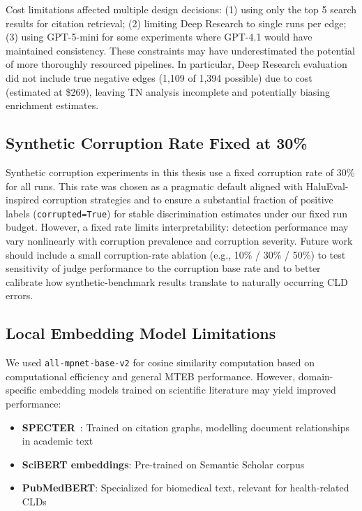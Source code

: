 Cost limitations affected multiple design decisions: (1) using only the top 5 search results for citation retrieval; (2) limiting Deep Research to single runs per edge; (3) using GPT-5-mini for some experiments where GPT-4.1 would have maintained consistency. These constraints may have underestimated the potential of more thoroughly resourced pipelines.
In particular, Deep Research evaluation did not include true negative edges (1,109 of 1,394 possible) due to cost (estimated at \$269), leaving TN analysis incomplete and potentially biasing enrichment estimates.






\subsection{Synthetic Corruption Rate Fixed at 30\%}
Synthetic corruption experiments in this thesis use a fixed corruption rate of 30\% for all runs. This rate was chosen as a pragmatic default aligned with HaluEval-inspired corruption strategies and to ensure a substantial fraction of positive labels (\texttt{corrupted=True}) for stable discrimination estimates under our fixed run budget. However, a fixed rate limits interpretability: detection performance may vary nonlinearly with corruption prevalence and corruption severity. Future work should include a small corruption-rate ablation (e.g., 10\% / 30\% / 50\%) to test sensitivity of judge performance to the corruption base rate and to better calibrate how synthetic-benchmark results translate to naturally occurring CLD errors.

\subsection{Local Embedding Model Limitations}

We used \texttt{all-mpnet-base-v2} for cosine similarity computation based on computational efficiency and general MTEB performance. However, domain-specific embedding models trained on scientific literature may yield improved performance:
\begin{itemize}[noitemsep]
    \item \textbf{SPECTER}~\citep{cohan2020specter}: Trained on citation graphs, modelling document relationships in academic text
    \item \textbf{SciBERT embeddings}: Pre-trained on Semantic Scholar corpus
    \item \textbf{PubMedBERT}: Specialized for biomedical text, relevant for health-related CLDs
\end{itemize}

